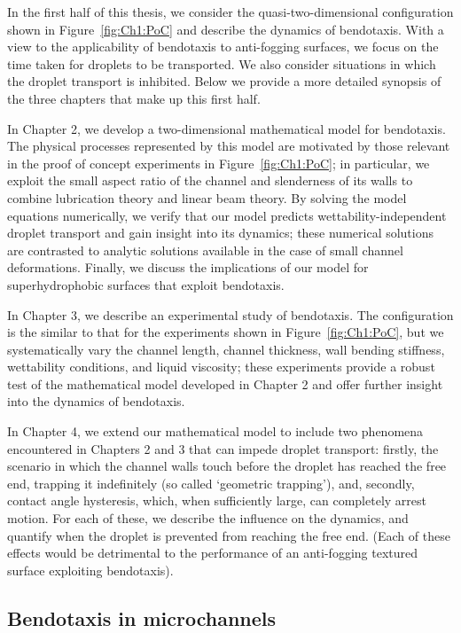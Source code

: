 In the first half of this thesis, we consider the quasi-two-dimensional configuration shown in Figure~\ref{fig:Ch1:PoC} and describe the dynamics of bendotaxis. With a view to the applicability of bendotaxis to anti-fogging surfaces, we focus on the time taken for droplets to be transported. We also consider situations in which the droplet transport is inhibited. Below we provide a more detailed synopsis of the three chapters that make up this first half.

In Chapter 2, we develop a two-dimensional mathematical model for bendotaxis. The physical processes represented by this model are motivated by those relevant in the proof of concept experiments in Figure~\ref{fig:Ch1:PoC}; in particular, we exploit the small aspect ratio of the channel and slenderness of its walls to combine lubrication theory and linear beam theory. By solving the model equations numerically, we verify that our model predicts wettability-independent droplet transport and gain insight into its dynamics; these numerical solutions are contrasted to analytic solutions available in the case of small channel deformations. Finally, we discuss the implications of our model for superhydrophobic surfaces that exploit bendotaxis.

In Chapter 3, we describe an experimental study of bendotaxis. The configuration is the similar to that for the experiments shown in Figure~\ref{fig:Ch1:PoC}, but we systematically vary the channel length, channel thickness, wall bending stiffness, wettability conditions, and liquid viscosity; these experiments provide a robust test of the mathematical model developed in Chapter 2 and offer further insight into the dynamics of bendotaxis.

In Chapter 4, we extend our mathematical model to include two phenomena encountered in Chapters 2 and 3 that can impede droplet transport: firstly, the scenario in which the channel walls touch before the droplet has reached the free end, trapping it indefinitely (so called `geometric trapping'), and, secondly, contact angle hysteresis, which, when sufficiently large, can completely arrest motion. For each of these, we describe the influence on the dynamics, and quantify when the droplet is prevented from reaching the free end. (Each of these effects would be detrimental to the performance of an anti-fogging textured surface exploiting bendotaxis).

\subsection{Bendotaxis in microchannels}

